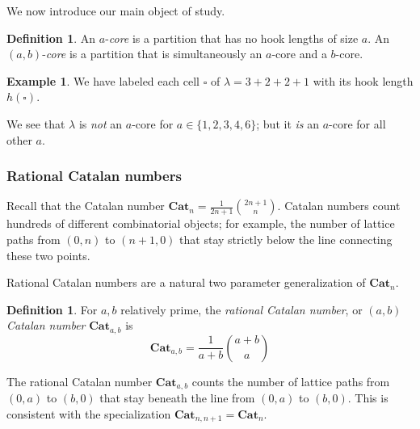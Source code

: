 \documentclass{amsart}[12pt]
\theoremstyle{definition}
\newtheorem{example}[dummy]{Example}
\newtheorem{definition}[dummy]{Definition}
\newcommand{\Cat}{\mathbf{Cat}}
\begin{document}
We now introduce our main object of study.
\begin{definition}
An $a$-\emph{core} is a partition that has no hook lengths of size $a$.  An $(a,b)$-\emph{core} is a partition that is simultaneously an $a$-core and a $b$-core.

\end{definition}


\begin{example}
We have labeled each cell $\square$ of $\lambda=3+2+2+1$ with its hook length $h(\square)$.

\begin{center}
\end{center}
We see that $\lambda$ is \emph{not} an $a$-core for $a\in \{1,2,3,4,6\}$;
but it \emph{is} an $a$-core for all other $a$.
\end{example}

\subsubsection{Rational Catalan numbers}
Recall that the Catalan number $\Cat_n=\frac{1}{2n+1}\binom{2n+1}{n}$.  Catalan numbers count hundreds of different combinatorial objects; for example, the number of lattice paths from $(0,n)$ to $(n+1,0)$ that stay strictly below the line connecting these two points.

Rational Catalan numbers are a natural two parameter generalization of $\Cat_n$.
\begin{definition}
For $a,b$ relatively prime, the \emph{rational Catalan number}, or \emph{$(a,b)$ Catalan number} $\Cat_{a,b}$ is 
$$\Cat_{a,b}=\frac{1}{a+b}\binom{a+b}{a}$$ 
\end{definition}

The rational Catalan number $\Cat_{a,b}$ counts the number of lattice paths from $(0,a)$ to $(b,0)$ that stay beneath the line from $(0,a)$ to $(b,0)$.  This is consistent with the specialization $\Cat_{n,n+1}=\Cat_n$.
\end{document}
